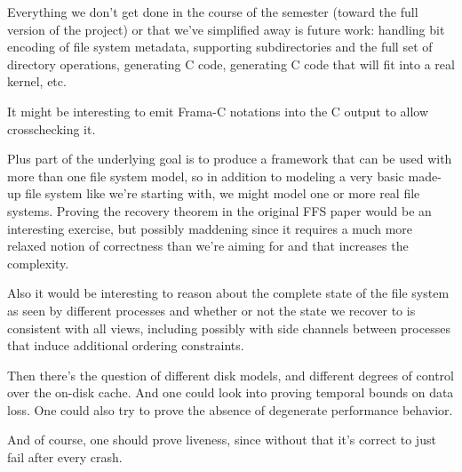 \documentclass[11pt, twocolumn, letterpaper]{article}
\begin{document}

Everything we don't get done in the course of the semester (toward the
full version of the project) or that we've simplified away is future
work: handling bit encoding of file system metadata, supporting
subdirectories and the full set of directory operations, generating C
code, generating C code that will fit into a real kernel, etc.

It might be interesting to emit Frama-C notations into the C output to
allow crosschecking it.

Plus part of the underlying goal is to produce a framework that can be
used with more than one file system model, so in addition to modeling
a very basic made-up file system like we're starting with, we might
model one or more real file systems.
Proving the recovery theorem in the original FFS paper would be an
interesting exercise, but possibly maddening since it requires a much
more relaxed notion of correctness than we're aiming for and that
increases the complexity.

Also it would be interesting to reason about the complete state of the
file system as seen by different processes and whether or not the
state we recover to is consistent with all views, including possibly
with side channels between processes that induce additional ordering
constraints.

Then there's the question of different disk models, and different
degrees of control over the on-disk cache.
And one could look into proving temporal bounds on data loss.
One could also try to prove the absence of degenerate performance
behavior.

And of course, one should prove liveness, since without that it's
correct to just fail after every crash.


%
%
\end{document}
